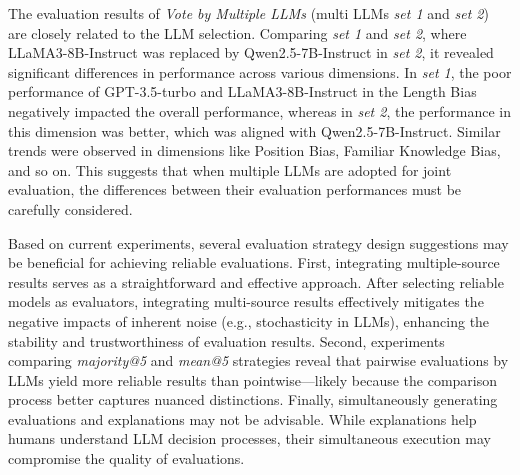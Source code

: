 \documentclass[acmsmall,screen]{acmart}
\begin{document}
The evaluation results of \textit{Vote by Multiple LLMs} (multi LLMs \textit{set 1} and \textit{set 2}) are closely related to the LLM selection. Comparing \textit{set 1} and \textit{set 2}, where LLaMA3-8B-Instruct was replaced by Qwen2.5-7B-Instruct in \textit{set 2}, it revealed significant differences in performance across various dimensions. In \textit{set 1}, the poor performance of GPT-3.5-turbo and LLaMA3-8B-Instruct in the Length Bias negatively impacted the overall performance, whereas in \textit{set 2}, the performance in this dimension was better, which was aligned with Qwen2.5-7B-Instruct. Similar trends were observed in dimensions like Position Bias, Familiar Knowledge Bias, and so on. This suggests that when multiple LLMs are adopted for joint evaluation, the differences between their evaluation performances must be carefully considered.

Based on current experiments, several evaluation strategy design suggestions may be beneficial for achieving reliable evaluations. First, integrating multiple-source results serves as a straightforward and effective approach. After selecting reliable models as evaluators, integrating multi-source results effectively mitigates the negative impacts of inherent noise (e.g., stochasticity in LLMs), enhancing the stability and trustworthiness of evaluation results. Second, experiments comparing \textit{majority@5} and \textit{mean@5} strategies reveal that pairwise evaluations by LLMs yield more reliable results than pointwise—likely because the comparison process better captures nuanced distinctions. Finally, simultaneously generating evaluations and explanations may not be advisable. While explanations help humans understand LLM decision processes, their simultaneous execution may compromise the quality of evaluations.
\end{document}
